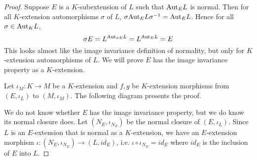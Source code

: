 \documentclass[../book.tex]{subfiles}
\begin{document}
\begin{proof}
    
        Suppose $E$ is a $K$-subextension of $L$ such that
        $\mathrm{Aut}_{E}L$ is normal. 
        Then for all $K$-extension automorphisms $\sigma$ of $L$, 
        $\sigma \mathrm{Aut}_{E}L \sigma^{-1} = \mathrm{Aut}_{E}L$.
        Hence for all $\sigma \in \mathrm{Aut}_{K}L$, \[
            \sigma E = L^{\mathrm{Aut}_{\sigma E}L} = L^{\mathrm{Aut}_{E}L} = E
        \]
        This looks almost like the image invariance definition of normality,
        but only for $K$-extension automorphisms of $L$. 
        We will prove $E$ has the image invariance property as a $K$-extension. 
        
        Let $\iota_M : K \to M$ be a $K$-extension and 
        $f, g$ be $K$-extension morphisms from $(E,\iota_L)$ to $(M,\iota_M)$.
        The following diagram presents the proof. 
        \begin{figure} [H]
            \centering
        \end{figure}
        We do not know whether $E$ has the image invariance property,
        but we do know its normal closure does. 
        Let $(N_E,\iota_{N_E})$ be the normal closure of $(E,\iota_L)$. 
        Since $L$ is an $E$-extension that is normal as a $K$-extension,
        we have an $E$-extension morphism 
        $\iota : (N_E,\iota_{N_E}) \to (L,id_E)$,
        i.e. $\iota\circ\iota_{N_E} = id_E$ 
        where $id_E$ is the inclusion of $E$ into $L$.  
        

\end{proof}
\end{document}
